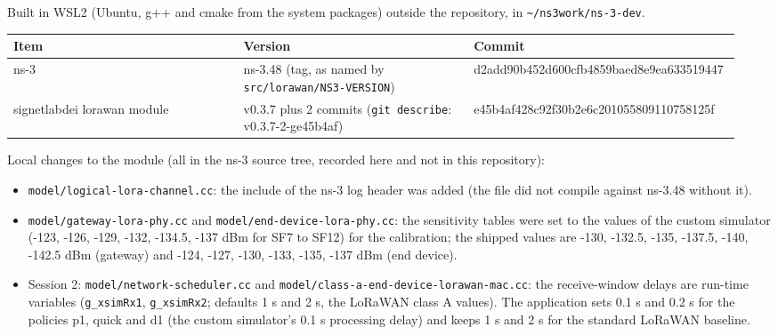 


Built in WSL2 (Ubuntu, g++ and cmake from the system packages) outside the repository, in \texttt{\textasciitilde{}/ns3work/ns-3-dev}.

{\scriptsize\raggedright
\begin{longtable}{p{0.317\linewidth}p{0.317\linewidth}p{0.317\linewidth}}
\toprule
Item & Version & Commit \\
\midrule
\endhead
ns-3 & ns-3.48 (tag, as named by \texttt{src/lorawan/NS3-VERSION}) & d2add90b452d600cfb4859baed8e9ea633519447 \\
signetlabdei lorawan module & v0.3.7 plus 2 commits (\texttt{git describe}: v0.3.7-2-ge45b4af) & e45b4af428c92f30b2e6c201055809110758125f \\
\bottomrule
\end{longtable}}

Local changes to the module (all in the ns-3 source tree, recorded here and not in this repository):
\begin{itemize}
\item \texttt{model/logical-lora-channel.cc}: the include of the ns-3 log header was added (the file did not compile against ns-3.48 without it).
\item \texttt{model/gateway-lora-phy.cc} and \texttt{model/end-device-lora-phy.cc}: the sensitivity tables were set to the values of the custom simulator (-123, -126, -129, -132, -134.5, -137 dBm for SF7 to SF12) for the calibration; the shipped values are -130, -132.5, -135, -137.5, -140, -142.5 dBm (gateway) and -124, -127, -130, -133, -135, -137 dBm (end device).
\end{itemize}

\begin{itemize}
\item Session 2: \texttt{model/network-scheduler.cc} and \texttt{model/class-a-end-device-lorawan-mac.cc}: the receive-window delays are run-time variables (\texttt{g\_xsimRx1}, \texttt{g\_xsimRx2}; defaults 1 s and 2 s, the LoRaWAN class A values). The application sets 0.1 s and 0.2 s for the policies p1, quick and d1 (the custom simulator's 0.1 s processing delay) and keeps 1 s and 2 s for the standard LoRaWAN baseline.
\end{itemize}

